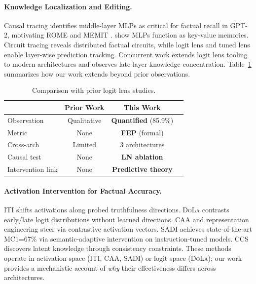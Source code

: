 \documentclass{article}
\newcommand{\iti}{\textsc{ITI}}
\newcommand{\dola}{\textsc{DoLa}}
\newcommand{\caa}{\textsc{CAA}}
\begin{document}
\paragraph{Knowledge Localization and Editing.}
Causal tracing \citep{meng2022locating} identifies middle-layer MLPs as critical for factual recall in GPT-2, motivating ROME and MEMIT \citep{meng2022mass}. \citet{geva2021transformer,geva2022transformer} show MLPs function as key-value memories. Circuit tracing \citep{anthropic2025circuittracing} reveals distributed factual circuits, while logit lens \citep{nostalgebraist2020logitlens} and tuned lens \citep{belrose2023tuned} enable layer-wise prediction tracking. Concurrent work \citep{wang2025logitlens4llms} extends logit lens tooling to modern architectures and observes late-layer knowledge concentration. Table~\ref{tab:prior_work} summarizes how our work extends beyond prior observations.

\begin{table}[t]
\centering\small
\begin{tabular}{lccc}
\toprule
& \textbf{Prior Work} & \textbf{This Work} \\
\midrule
Observation & Qualitative & \textbf{Quantified} (85.9\%) \\
Metric & None & \textbf{FEP} (formal) \\
Cross-arch & Limited & 3 architectures \\
Causal test & None & \textbf{LN ablation} \\
Intervention link & None & \textbf{Predictive theory} \\
\bottomrule
\end{tabular}
\caption{Comparison with prior logit lens studies.}
\label{tab:prior_work}
\end{table}

\paragraph{Activation Intervention for Factual Accuracy.}
\iti{} \citep{li2023inference} shifts activations along probed truthfulness directions. \dola{} \citep{chuang2024dola} contrasts early/late logit distributions without learned directions. \caa{} \citep{turner2023activation} and representation engineering \citep{zou2023representation} steer via contrastive activation vectors. SADI \citep{zhang2025sadi} achieves state-of-the-art MC1=67\% via semantic-adaptive intervention on instruction-tuned models. CCS \citep{burns2022discovering} discovers latent knowledge through consistency constraints. These methods operate in activation space (\iti{}, \caa{}, SADI) or logit space (\dola{}); our work provides a mechanistic account of \emph{why} their effectiveness differs across architectures.
\end{document}
